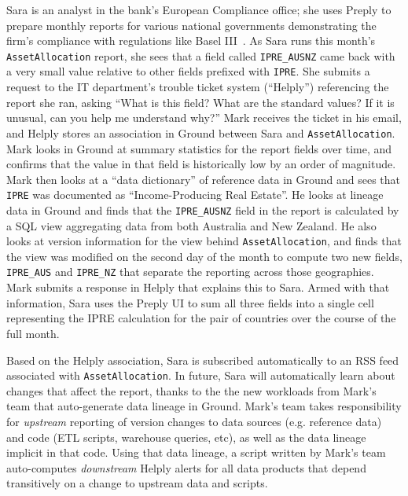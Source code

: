 \documentclass{cidr-2017}
\begin{document}
Sara is an analyst in the bank's European Compliance office; she uses Preply to prepare monthly reports for various national governments demonstrating the firm's compliance with regulations like Basel III~\cite{basel3}. As Sara runs this month's \texttt{AssetAllocation} report, she sees that a field called \texttt{IPRE\_AUSNZ} came back with a very small value relative to other fields prefixed with \texttt{IPRE}. She submits a request to the IT department's trouble ticket system (``Helply'') referencing the report she ran, asking ``What is this field? What are the standard values? If it is unusual, can you help me understand why?'' Mark receives the ticket in his email, and Helply stores an association in Ground between Sara and \texttt{AssetAllocation}. Mark looks in Ground at summary statistics for the report fields over time, and confirms that the value in that field is historically low by an order of magnitude. Mark then looks at a ``data dictionary'' of reference data in Ground and sees that \texttt{IPRE} was documented as ``Income-Producing Real Estate''. He looks at lineage data in Ground and finds that the \texttt{IPRE\_AUSNZ} field in the report is calculated by a SQL view aggregating data from both Australia and New Zealand. He also looks at version information for the view behind \texttt{AssetAllocation}, and finds that the view was modified on the second day of the month to compute two new fields, \texttt{IPRE\_AUS} and \texttt{IPRE\_NZ} that separate the reporting across those geographies. Mark submits a response in Helply that explains this to Sara. Armed with that information, Sara uses the Preply UI to sum all three fields into a single cell representing the IPRE calculation for the pair of countries over the course of the full month.

Based on the Helply association, Sara is subscribed automatically to an RSS feed associated with \texttt{AssetAllocation}. In future, Sara will automatically learn about changes that affect the report, thanks to the the new workloads from Mark's team that auto-generate data lineage in Ground. Mark's team takes responsibility for \emph{upstream} reporting of version changes to data sources (e.g. reference data) and code (ETL scripts, warehouse queries, etc), as well as the data lineage implicit in that code.
Using that data lineage, a script written by Mark's team auto-computes \emph{downstream} Helply alerts for all data products that depend transitively on a change to upstream data and scripts.
\end{document}
